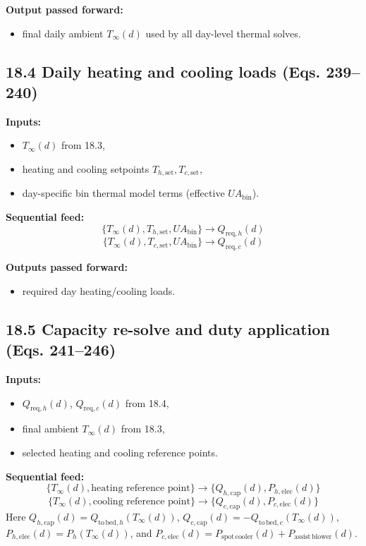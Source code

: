 \documentclass[11pt]{article}
\begin{document}
\textbf{Output passed forward:}
\begin{itemize}[leftmargin=*]
\item final daily ambient \(T_{\infty}(d)\) used by all day-level thermal solves.
\end{itemize}

\subsection*{18.4 Daily heating and cooling loads (Eqs. 239--240)}
\textbf{Inputs:}
\begin{itemize}[leftmargin=*]
\item \(T_{\infty}(d)\) from 18.3,
\item heating and cooling setpoints \(T_{h,\mathrm{set}}, T_{c,\mathrm{set}}\),
\item day-specific bin thermal model terms (effective \(UA_{\mathrm{bin}}\)).
\end{itemize}

\textbf{Sequential feed:}
\[
\{T_{\infty}(d),T_{h,\mathrm{set}},UA_{\mathrm{bin}}\}
\rightarrow
Q_{\mathrm{req},h}(d)
\]
\[
\{T_{\infty}(d),T_{c,\mathrm{set}},UA_{\mathrm{bin}}\}
\rightarrow
Q_{\mathrm{req},c}(d)
\]

\textbf{Outputs passed forward:}
\begin{itemize}[leftmargin=*]
\item required day heating/cooling loads.
\end{itemize}

\subsection*{18.5 Capacity re-solve and duty application (Eqs. 241--246)}
\textbf{Inputs:}
\begin{itemize}[leftmargin=*]
\item \(Q_{\mathrm{req},h}(d)\), \(Q_{\mathrm{req},c}(d)\) from 18.4,
\item final ambient \(T_{\infty}(d)\) from 18.3,
\item selected heating and cooling reference points.
\end{itemize}

\textbf{Sequential feed:}
\[
\{T_{\infty}(d),\text{heating reference point}\}
\rightarrow
\{Q_{h,\mathrm{cap}}(d),P_{h,\mathrm{elec}}(d)\}
\]
\[
\{T_{\infty}(d),\text{cooling reference point}\}
\rightarrow
\{Q_{c,\mathrm{cap}}(d),P_{c,\mathrm{elec}}(d)\}
\]
Here \(Q_{h,\mathrm{cap}}(d)=Q_{\mathrm{to\,bed},h}(T_\infty(d))\), \(Q_{c,\mathrm{cap}}(d)=-Q_{\mathrm{to\,bed},c}(T_\infty(d))\), \(P_{h,\mathrm{elec}}(d)=P_h(T_\infty(d))\), and \(P_{c,\mathrm{elec}}(d)=P_{\mathrm{spot\,cooler}}(d)+P_{\mathrm{assist\,blower}}(d)\).
\end{document}
